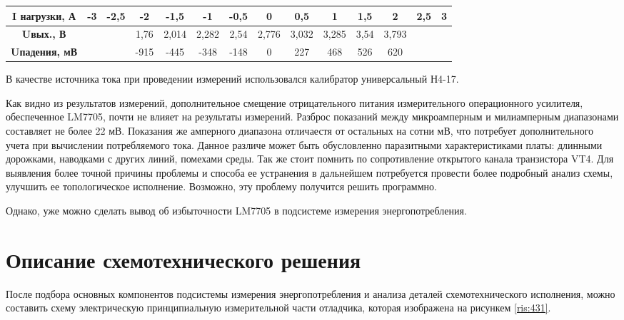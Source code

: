 \begin{table}[H]
\begin{turn}{90}
\begin{tabular}{|c|c|c|c|c|c|c|c|c|c|c|c|c|c|}
      \hline
      \textbf{I нагрузки, А} & -3    & -2,5  & -2    & -1,5  & -1    & -0,5  & 0     & 0,5   & 1     & 1,5   & 2     & 2,5   & 3 \bigstrut\\
      \hline
      \textbf{Uвых., В} &       &       & 1,76  & 2,014 & 2,282 & 2,54  & 2,776 & 3,032 & 3,285 & 3,54  & 3,793 &       &  \bigstrut\\
      \hline
      \textbf{Uпадения, мВ} &       &       & -915  & -445  & -348  & -148  & 0     & 227   & 468   & 526   & 620   &       &  \bigstrut\\
      \hline
      \end{tabular}%
    \label{tab:I_meas}%
    \end{turn}
  \end{table}%
  
В качестве источника тока при проведении измерений использовался калибратор универсальный Н4-17.

Как видно из результатов измерений, дополнительное смещение отрицательного питания измерительного операционного
усилителя, обеспеченное LM7705, почти не влияет на результаты измерений. Разброс показаний между микроамперным и 
милиамперным диапазонами составляет не более 22 мВ. Показания же амперного диапазона отличаестя от остальных на 
сотни мВ, что потребует дополнительного учета при вычислении потребляемого тока. Данное различе может быть
обусловленно паразитными характеристиками платы: длинными дорожками, наводками с других линий, помехами среды. Так 
же стоит помнить по сопротивление открытого канала транзистора VT4. Для выявления более точной причины проблемы
и способа ее устранения в дальнейшем потребуется провести более подробный анализ схемы, улучшить ее топологическое
исполнение. Возможно, эту проблему получится решить программно. 

Однако, уже можно сделать вывод об избыточности LM7705 в подсистеме измерения энергопотребления.



\section{Описание схемотехнического решения}
\hspace{1cm} 

После подбора основных компонентов подсистемы измерения энергопотребления и анализа деталей схемотехнического
исполнения, можно составить схему электрическую принципиальную измерительной части отладчика, 
которая изображена на рисункем \ref{ris:431}.

